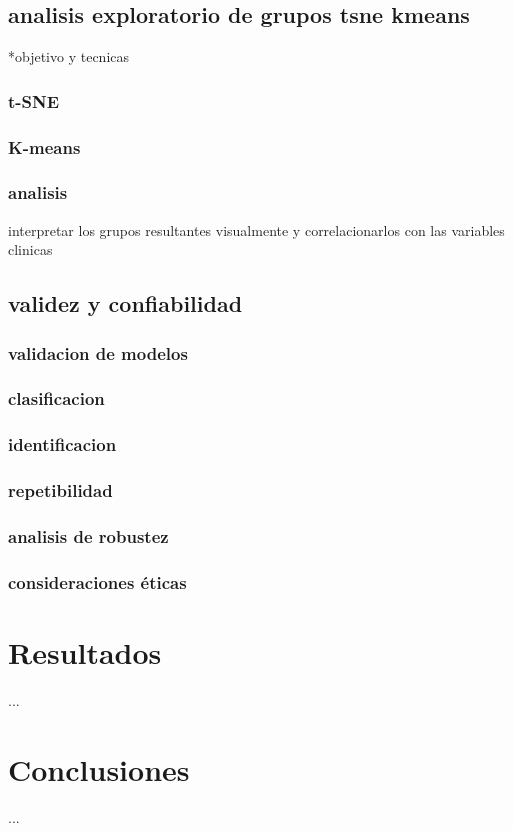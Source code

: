 \documentclass[12pt,letterpaper,oneside,openright]{book}
\begin{document}
\section{analisis exploratorio de grupos tsne kmeans}
*objetivo y tecnicas
\subsection{t-SNE}
\subsection{K-means}
\subsection{analisis} interpretar los grupos resultantes visualmente y correlacionarlos con las variables clinicas


\section{validez y confiabilidad}
\subsection{validacion de modelos}
\subsection{clasificacion}
\subsection{identificacion}
\subsection{repetibilidad}
\subsection{analisis de robustez}
\subsection{consideraciones éticas}

\chapter{Resultados}

...

\chapter{Conclusiones}

...


 
\end{document}
